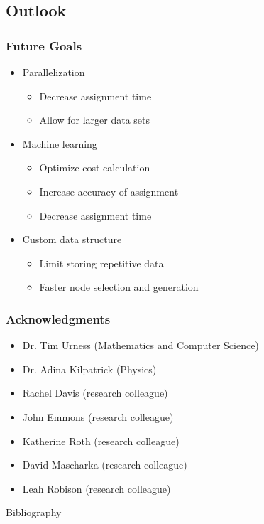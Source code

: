 \documentclass{beamer}
\begin{document}
\subsection{Outlook}
\begin{frame}
	\frametitle{Future Goals} 
	\begin{itemize}
		\item Parallelization
		\begin{itemize}
			\item Decrease assignment time
			\item Allow for larger data sets
		\end{itemize}
		\item Machine learning 
		\begin{itemize}
			\item Optimize cost calculation
			\item Increase accuracy of assignment
			\item Decrease assignment time
		\end{itemize}
		\item Custom data structure
		\begin{itemize}
			\item Limit storing repetitive data
			\item Faster node selection and generation
		\end{itemize}
	\end{itemize} 
\end{frame}

\begin{frame}
	\frametitle{Acknowledgments}
	\begin{itemize}
		\item Dr. Tim Urness (Mathematics and Computer Science)
		\item Dr. Adina Kilpatrick (Physics)
		\item Rachel Davis (research colleague)
		\item John Emmons (research colleague)
		\item  Katherine Roth (research colleague)
		\item  David Mascharka (research colleague)
		\item  Leah Robison (research colleague)
	\end{itemize}
\end{frame} 

\begin{frame}{Bibliography}
\nocite{*}


\end{frame}
\end{document}
